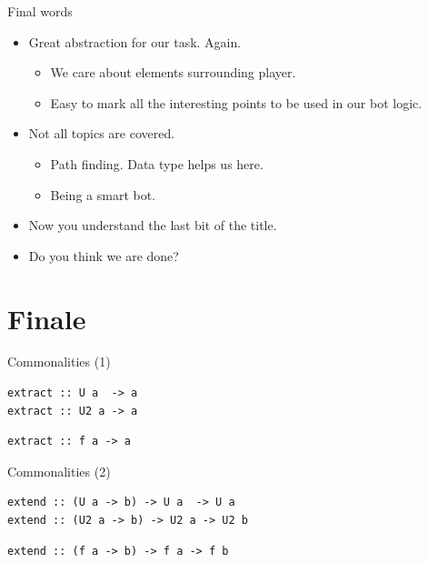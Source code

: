 \documentclass[presentation,aspectratio=169,smaller]{beamer}
\begin{document}
\begin{frame}[label={sec:orgfb15453}]{Final words}
\begin{itemize}
\item <1-> Great abstraction for our task. Again.
\begin{itemize}
\item We care about elements surrounding player.
\item Easy to mark all the interesting points to be used in our bot logic.
\end{itemize}
\item <2-> Not all topics are covered.
\begin{itemize}
\item Path finding. Data type helps us here.
\item Being a smart bot.
\end{itemize}
\item <3-> Now you understand the last bit of the title.
\item <4-> Do you think we are done?
\end{itemize}
\end{frame}

\section{Finale}
\label{sec:org7f1c0a8}

\begin{frame}[label={sec:orgef5df5d},fragile]{Commonalities (1)}
 \begin{verbatim}
extract :: U a  -> a
extract :: U2 a -> a
\end{verbatim}

\pause

\begin{verbatim}
extract :: f a -> a
\end{verbatim}
\end{frame}

\begin{frame}[label={sec:orgc9f020e},fragile]{Commonalities (2)}
 \begin{verbatim}
extend :: (U a -> b) -> U a  -> U a
extend :: (U2 a -> b) -> U2 a -> U2 b
\end{verbatim}

\pause

\begin{verbatim}
extend :: (f a -> b) -> f a -> f b
\end{verbatim}
\end{frame}
\end{document}
